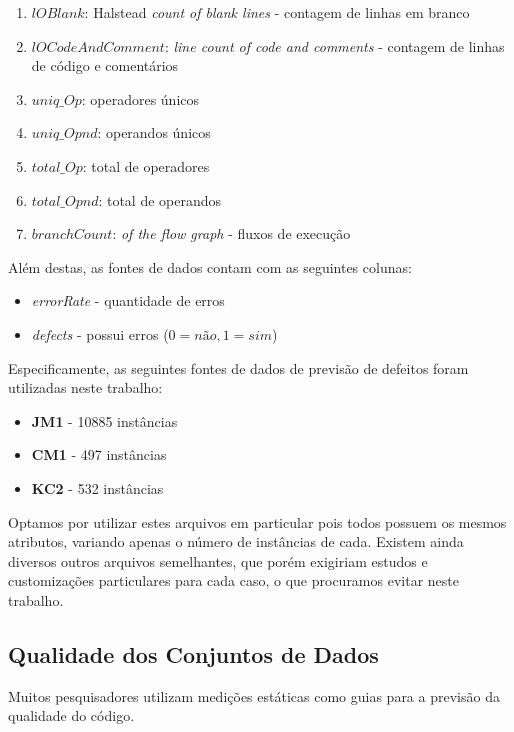 \documentclass[10pt]{article}
\begin{document}
\begin{enumerate}
        \item $lOBlank$: Halstead \textit{count of blank lines} - contagem de linhas em branco
        \item $lOCodeAndComment$: \textit{line count of code and comments} - contagem de linhas de código e comentários
        \item $uniq\_Op$: operadores únicos
        \item $uniq\_Opnd$: operandos únicos
        \item $total\_Op$: total de operadores
        \item $total\_Opnd$: total de operandos
        \item $branchCount$: \textit{of the flow graph} - fluxos de execução
    \end{enumerate}

    Além destas, as fontes de dados contam com as seguintes colunas:

    \begin{itemize}
        \item \textit{errorRate} - quantidade de erros
        \item \textit{defects} - possui erros ($0 = \textit{não}, 1 = \textit{sim}$)
    \end{itemize}

    Especificamente, as seguintes fontes de dados de previsão de defeitos foram utilizadas neste trabalho:

    \begin{itemize}
        \item \textbf{JM1} - 10885 instâncias
        \item \textbf{CM1} - 497 instâncias
        \item \textbf{KC2} - 532 instâncias
    \end{itemize}

    Optamos por utilizar estes arquivos em particular pois todos possuem os mesmos atributos, variando apenas o número de instâncias de cada. Existem ainda diversos outros arquivos semelhantes, que porém exigiriam estudos e customizações particulares para cada caso, o que procuramos evitar neste trabalho.

    \subsection{Qualidade dos Conjuntos de Dados}

        Muitos pesquisadores utilizam medições estáticas como guias para a previsão da qualidade do código.
\end{document}

